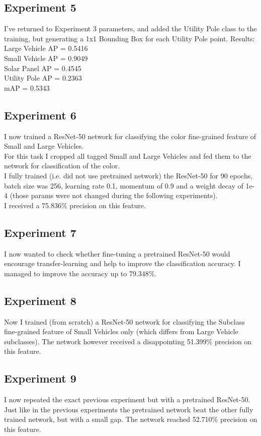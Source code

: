\documentclass[]{article}
\begin{document}
\subsection{Experiment 5}
I've returned to Experiment 3 parameters, and added the Utility Pole class to the training, but generating a 1x1 Bounding Box for each Utility Pole point.
Results:\\
Large Vehicle AP = 0.5416\\
Small Vehicle AP = 0.9049\\
Solar Panel AP = 0.4545\\
Utility Pole AP = 0.2363\\
mAP = 0.5343

\subsection{Experiment 6}
I now trained a ResNet-50 network for classifying the color fine-grained feature of Small and Large Vehicles.\\
For this task I cropped all tagged Small and Large Vehicles and fed them to the network for classification of the color.\\
I fully trained (i.e. did not use pretrained network) the ResNet-50 for 90 epochs, batch size was 256, learning rate 0.1, momentum of 0.9 and a weight decay of 1e-4 (those params were not changed during the following experiments).\\
I received a 75.836\% precision on this feature.

\subsection{Experiment 7}
I now wanted to check whether fine-tuning a pretrained ResNet-50 would encourage transfer-learning and help to improve the classification accuracy.
I managed to improve the accuracy up to 79.348\%.

\subsection{Experiment 8}
Now I trained (from scratch) a ResNet-50 network for classifying the Subclass fine-grained feature of Small Vehicles only (which differs from Large Vehicle subclasses).
The network however received a disappointing 51.399\% precision on this feature.

\subsection{Experiment 9}
I now repeated the exact previous experiment but with a pretrained ResNet-50.\\
Just like in the previous experiments the pretrained network beat the other fully trained network, but with a small gap. The network reached 52.710\% precision on this feature.
\end{document}
